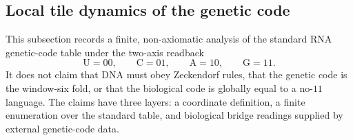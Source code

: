 \subsection{Local tile dynamics of the genetic code}
\label{subsec:philosophy-dna-window-six-boundary-tiles}

This subsection records a finite, non-axiomatic analysis of the standard
RNA genetic-code table under the two-axis readback
$$
  \mathrm{U}=00,\qquad
  \mathrm{C}=01,\qquad
  \mathrm{A}=10,\qquad
  \mathrm{G}=11.
$$
It does not claim that DNA must obey Zeckendorf rules, that the genetic
code is the window-six fold, or that the biological code is globally equal
to a no-$11$ language. The claims have three layers: a coordinate
definition, a finite enumeration over the standard table, and biological
bridge readings supplied by external genetic-code data.

